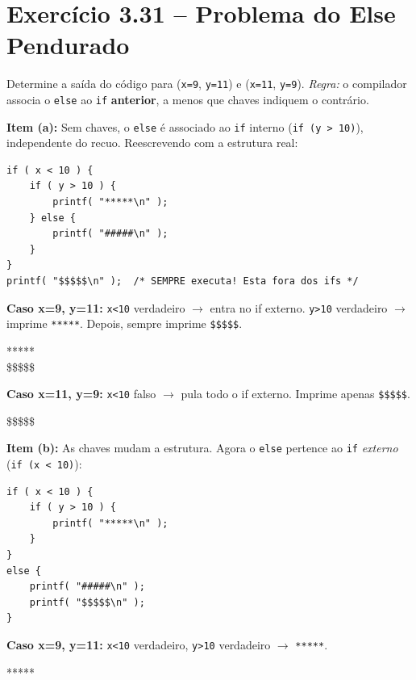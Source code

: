 \documentclass[12pt,a4paper]{article}
\begin{document}
\newpage

\section{Exercício 3.31 -- Problema do Else Pendurado}

\begin{enunciadoBox}[Enunciado 3.31]
Determine a saída do código para (\texttt{x=9}, \texttt{y=11}) e (\texttt{x=11}, \texttt{y=9}).
\textit{Regra:} o compilador associa o \texttt{else} ao \texttt{if} \textbf{anterior},
a menos que chaves indiquem o contrário.
\end{enunciadoBox}

\begin{respostabox}

\textbf{Item (a):} Sem chaves, o \texttt{else} é associado ao \texttt{if} interno
(\texttt{if (y > 10)}), independente do recuo. Reescrevendo com a estrutura real:

\begin{lstlisting}
if ( x < 10 ) {
    if ( y > 10 ) {
        printf( "*****\n" );
    } else {
        printf( "#####\n" );
    }
}
printf( "$$$$$\n" );  /* SEMPRE executa! Esta fora dos ifs */
\end{lstlisting}

\textbf{Caso x=9, y=11:} \texttt{x<10} verdadeiro $\to$ entra no if externo.
\texttt{y>10} verdadeiro $\to$ imprime \texttt{*****}. Depois, sempre imprime \texttt{\$\$\$\$\$}.
\begin{saida}
*****\\
\$\$\$\$\$
\end{saida}

\textbf{Caso x=11, y=9:} \texttt{x<10} falso $\to$ pula todo o if externo.
Imprime apenas \texttt{\$\$\$\$\$}.
\begin{saida}
\$\$\$\$\$
\end{saida}

\bigskip
\textbf{Item (b):} As chaves mudam a estrutura. Agora o \texttt{else} pertence
ao \texttt{if} \textit{externo} (\texttt{if (x < 10)}):

\begin{lstlisting}
if ( x < 10 ) {
    if ( y > 10 ) {
        printf( "*****\n" );
    }
}
else {
    printf( "#####\n" );
    printf( "$$$$$\n" );
}
\end{lstlisting}

\textbf{Caso x=9, y=11:} \texttt{x<10} verdadeiro, \texttt{y>10} verdadeiro $\to$ \texttt{*****}.
\begin{saida}
*****
\end{saida}


\end{respostabox}
\end{document}
